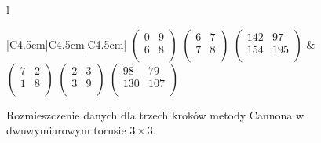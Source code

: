 \begin{przyklad}
\begin{figure}[H]
\begin{tabular}{l}
\begin{tabular}{|C{4.5cm}|C{4.5cm}|C{4.5cm}|}
\(\begin{pmatrix}
        0 & 9 \\
        6 & 8 \\    
\end{pmatrix}\)
\(\begin{pmatrix}
        6 & 7 \\
        7 & 8 \\    
\end{pmatrix}\)
\(\begin{pmatrix}
        142 & 97 \\
        154 & 195 \\    
\end{pmatrix}\) &
\(\begin{pmatrix}
        7 & 2 \\
        1 & 8 \\    
\end{pmatrix}\)
\(\begin{pmatrix}
        2 & 3 \\
        3 & 9 \\    
\end{pmatrix}\)
\(\begin{pmatrix}
        98 & 79 \\
        130 & 107 \\    
\end{pmatrix}\) \\
\hline
\end{tabular} 
\end{tabular}
\vspace{0.5cm}


\caption{Rozmieszczenie danych dla trzech kroków metody Cannona w dwuwymiarowym torusie \(3\times 3\).}
\label{fig:cannon_last_one}
\end{figure}




\end{przyklad}